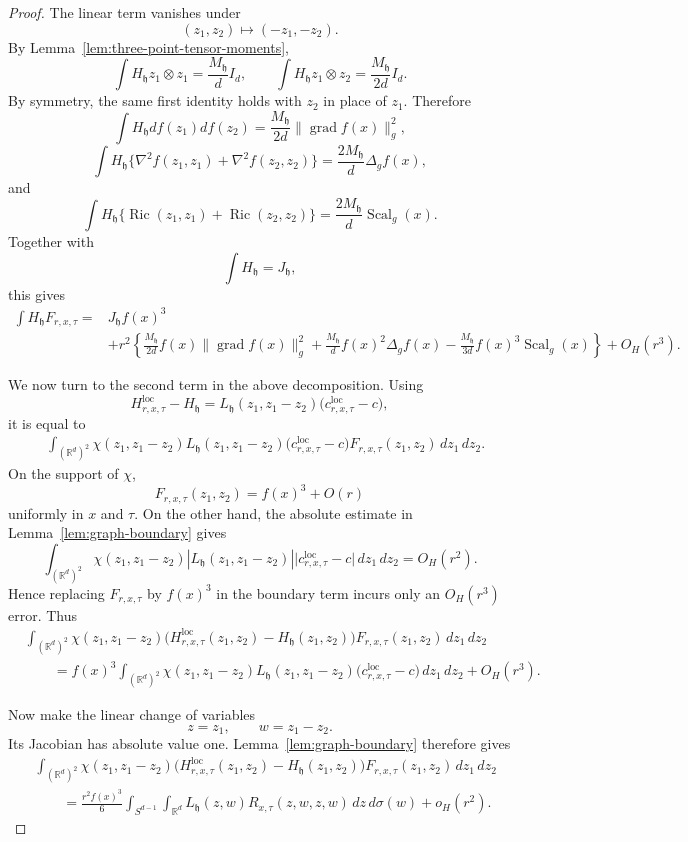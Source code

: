 \documentclass[11pt]{article}
\theoremstyle{remark}
\newcommand{\R}{\mathbb R}
\newcommand{\Scal}{\operatorname{Scal}}
\newcommand{\Ric}{\operatorname{Ric}}
\newcommand{\grad}{\operatorname{grad}}
\numberwithin{equation}{section}
\begin{document}
\begin{proof}
The linear term vanishes under
\[
(z_1,z_2)\longmapsto(-z_1,-z_2).
\]
By Lemma~\ref{lem:three-point-tensor-moments},
\[
\int H_{\mathfrak h}z_1\otimes z_1
=
\frac{M_{\mathfrak h}}dI_d,
\qquad
\int H_{\mathfrak h}z_1\otimes z_2
=
\frac{M_{\mathfrak h}}{2d}I_d.
\]
By symmetry, the same first identity holds with \(z_2\) in place of
\(z_1\).  Therefore
\[
\int
H_{\mathfrak h}
df(z_1)df(z_2)
=
\frac{M_{\mathfrak h}}{2d}
\|\grad f(x)\|_g^2,
\]
\[
\int
H_{\mathfrak h}
\{
\nabla^2f(z_1,z_1)
+
\nabla^2f(z_2,z_2)
\}
=
\frac{2M_{\mathfrak h}}d
\Delta_g f(x),
\]
and
\[
\int
H_{\mathfrak h}
\{
\Ric(z_1,z_1)
+
\Ric(z_2,z_2)
\}
=
\frac{2M_{\mathfrak h}}d
\Scal_g(x).
\]
Together with
\[
\int H_{\mathfrak h}=J_{\mathfrak h},
\]
this gives
\[
\begin{aligned}
\int H_{\mathfrak h}F_{r,x,\tau}
={}&
J_{\mathfrak h}f(x)^3\\
&+
r^2\left\{
\frac{M_{\mathfrak h}}{2d}
f(x)\|\grad f(x)\|_g^2
+
\frac{M_{\mathfrak h}}d
f(x)^2\Delta_g f(x)
-
\frac{M_{\mathfrak h}}{3d}
f(x)^3\Scal_g(x)
\right\}
+
O_H(r^3).
\end{aligned}
\]

We now turn to the second term in the above decomposition.
Using
\[
H^{\mathrm{loc}}_{r,x,\tau}
-
H_{\mathfrak h}
=
L_{\mathfrak h}(z_1,z_1-z_2)
\bigl(
c^{\mathrm{loc}}_{r,x,\tau}-c
\bigr),
\]
it is equal to
\[
\begin{aligned}
&\int_{(\R^d)^2}
\chi(z_1,z_1-z_2)
L_{\mathfrak h}(z_1,z_1-z_2)
\bigl(
c^{\mathrm{loc}}_{r,x,\tau}-c
\bigr)
F_{r,x,\tau}(z_1,z_2)
\,dz_1\,dz_2.
\end{aligned}
\]
On the support of \(\chi\),
\[
F_{r,x,\tau}(z_1,z_2)
=
f(x)^3+O(r)
\]
uniformly in \(x\) and \(\tau\).  On the other hand, the absolute estimate
in Lemma~\ref{lem:graph-boundary} gives
\[
\int_{(\R^d)^2}
\chi(z_1,z_1-z_2)
|L_{\mathfrak h}(z_1,z_1-z_2)|
\bigl|
c^{\mathrm{loc}}_{r,x,\tau}-c
\bigr|
\,dz_1\,dz_2
=
O_H(r^2).
\]
Hence replacing \(F_{r,x,\tau}\) by \(f(x)^3\) in the boundary term
incurs only an \(O_H(r^3)\) error.  Thus
\[
\begin{aligned}
&\int_{(\R^d)^2}
\chi(z_1,z_1-z_2)
\bigl(
H^{\mathrm{loc}}_{r,x,\tau}(z_1,z_2)
-
H_{\mathfrak h}(z_1,z_2)
\bigr)
F_{r,x,\tau}(z_1,z_2)
\,dz_1\,dz_2\\
&\qquad=
f(x)^3
\int_{(\R^d)^2}
\chi(z_1,z_1-z_2)
L_{\mathfrak h}(z_1,z_1-z_2)
\bigl(
c^{\mathrm{loc}}_{r,x,\tau}-c
\bigr)
\,dz_1\,dz_2
+
O_H(r^3).
\end{aligned}
\]

Now make the linear change of variables
\[
z=z_1,
\qquad
w=z_1-z_2.
\]
Its Jacobian has absolute value one.  Lemma~\ref{lem:graph-boundary}
therefore gives
\[
\begin{aligned}
&\int_{(\R^d)^2}
\chi(z_1,z_1-z_2)
\bigl(
H^{\mathrm{loc}}_{r,x,\tau}(z_1,z_2)
-
H_{\mathfrak h}(z_1,z_2)
\bigr)
F_{r,x,\tau}(z_1,z_2)
\,dz_1\,dz_2\\
&\qquad=
\frac{r^2f(x)^3}{6}
\int_{S^{d-1}}\int_{\R^d}
L_{\mathfrak h}(z,w)
R_{x,\tau}(z,w,z,w)
\,dz\,d\sigma(w)
+
o_H(r^2).
\end{aligned}
\]


\end{proof}
\end{document}
